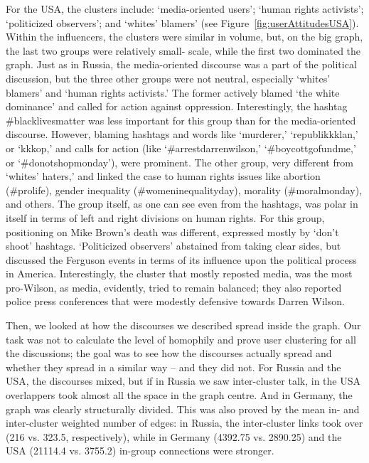 For the USA, the clusters include: ‘media-oriented users’; ‘human rights activists’; ‘politicized observers’; and ‘whites’ blamers’ (see Figure~\cref{fig:userAttitudesUSA}). Within the influencers, the clusters were similar in volume, but, on the big graph, the last two groups were relatively small- scale, while the first two dominated the graph. Just as in Russia, the media-oriented discourse was a part of the political discussion, but the three other groups were not neutral, especially ‘whites’ blamers’ and ‘human rights activists.’ The former actively blamed ‘the white dominance’ and called for action against oppression. Interestingly, the hashtag \#blacklivesmatter was less important for this group than for the media-oriented discourse. However, blaming hashtags and words like ‘murderer,’ ‘republikkklan,’ or ‘kkkop,’ and calls for action (like ‘\#arrestdarrenwilson,’ ‘\#boycottgofundme,’ or ‘\#donotshopmonday’), were prominent. The other group, very different from ‘whites’ haters,’ and linked the case to human rights issues like abortion (\#prolife), gender inequality (\#womeninequalityday), morality (\#moralmonday), and others. The group itself, as one can see even from the hashtags, was polar in itself in terms of left and right divisions on human rights. For this group, positioning on Mike Brown’s death was different, expressed mostly by ‘don’t shoot’ hashtags. ‘Politicized observers’ abstained from taking clear sides, but discussed the Ferguson events in terms of its influence upon the political process in America. Interestingly, the cluster that mostly reposted media, was the most pro-Wilson, as media, evidently, tried to remain balanced; they also reported police press conferences that were modestly defensive towards Darren Wilson.

Then, we looked at how the discourses we described spread inside the graph. Our task was not to calculate the level of homophily and prove user clustering for all the discussions; the goal was to see how the discourses actually spread and whether they spread in a similar way -- and they did not. For Russia and the USA, the discourses mixed, but if in Russia we saw inter-cluster talk, in the USA overlappers took almost all the space in the graph centre. And in Germany, the graph was clearly structurally divided. This was also proved by the mean in- and inter-cluster weighted number of edges: in Russia, the inter-cluster links took over (216 vs. 323.5, respectively), while in Germany (4392.75 vs. 2890.25) and the USA (21114.4 vs. 3755.2) in-group connections were stronger.

